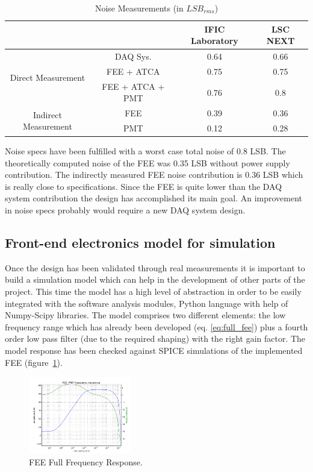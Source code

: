 \documentclass[a4paper, 10pt, oneside, twocolumn, 3p]{elsarticle}
\begin{document}
\begin{table}[ht]
	\caption{Noise Measurements (in $LSB_{rms}$)}
	\label{tab:noise}	
	\begin{center}
		\begin{tabular}{ c c || c | c |}
			& & IFIC Laboratory & LSC NEXT \\
			\hline
			\multirow{3}{*}{Direct Measurement} & DAQ Sys. & 0.64 & 0.66\\
			& FEE + ATCA & 0.75 & 0.75\\
			& FEE + ATCA + PMT & 0.76 & 0.8\\
			\hline
			\multirow{2}{*}{Indirect Measurement} & FEE & 0.39 & 0.36\\
			& PMT & 0.12 & 0.28\\
		\end{tabular}
	\end{center}
\end{table}


Noise specs have been fulfilled with a worst case total noise of 0.8 LSB. The theoretically computed noise of the FEE was 0.35 LSB without power supply contribution. The indirectly measured FEE noise contribution is 0.36 LSB which is really close to specifications. Since the FEE is quite lower than the DAQ system contribution the design has accomplished its main goal. An improvement in noise specs probably would require a new DAQ system design.

\subsection{Front-end electronics model for simulation}
Once the design has been validated through real measurements it is important to build a simulation model which can help in the development of other parts of the project. This time the model has a high level of abstraction in order to be easily integrated with the software analysis modules, Python language with help of Numpy-Scipy libraries. The model comprises two different elements: the low frequency range which has already been developed (eq. \ref{eq:full_fee}) plus a fourth order low pass filter (due to the required shaping) with the right gain factor. The model response has been checked against SPICE simulations of the implemented FEE (figure~\ref{fig:Full_Freq}).

\begin{figure}
	\begin{center}
		\includegraphics[width=0.4\textwidth]{./figures/FEEfull_freq.png}
		\caption{FEE Full Frequency Response.}
		\label{fig:Full_Freq}
	\end{center}
\end{figure}
\end{document}
